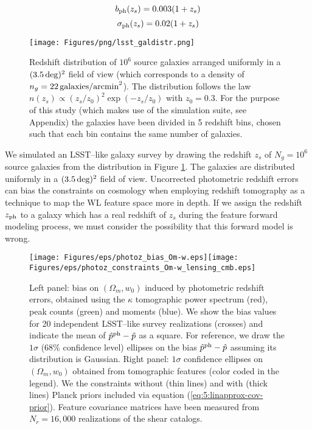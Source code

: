 \begin{equation}
\label{eq:7:bph}
b_{\rm ph}(z_s) = 0.003(1+z_s)
\end{equation}
%
\begin{equation}
\label{eq:7:sph}
\sigma_{\rm ph}(z_s) = 0.02(1+z_s)
\end{equation}
%
\begin{figure}
\begin{center}
\texttt{[image: Figures/png/lsst\_galdistr.png]}
\end{center}
\caption{Redshift distribution of $10^6$ source galaxies arranged uniformly in a $(3.5\,{\rm deg})^2$ field of view (which corresponds to a density of $n_g=22\,{\rm galaxies/arcmin}^2$). The distribution follows the law $n(z_s)\propto (z_s/z_0)^2\exp(-z_s/z_0)$ with $z_0=0.3$. For the purpose of this study (which makes use of the  simulation suite, see Appendix) the galaxies have been divided in 5 redshift bins, chosen such that each bin contains the same number of galaxies.}
\label{fig:7:galdistr}
\end{figure}
%
We simulated an LSST--like galaxy survey by drawing the redshift $z_s$ of $N_g=10^6$ source galaxies from the distribution in Figure \ref{fig:7:galdistr}. The galaxies are distributed uniformly in a $(3.5\,{\rm deg})^2$ field of view. Uncorrected photometric redshift errors can bias the constraints on cosmology when employing redshift tomography as a technique to map the WL feature space \citep{HutererWLSys,PetriPhotoZ} more in depth. If we assign the redshift $z_{\rm ph}$ to a galaxy which has a real redshift of $z_s$ during the feature forward modeling process, we must consider the possibility that this forward model is wrong. 
%
\begin{figure}
\begin{center}
\texttt{[image: Figures/eps/photoz\_bias\_Om-w.eps]}\texttt{[image: Figures/eps/photoz\_constraints\_Om-w\_lensing\_cmb.eps]}
\end{center}
\caption{Left panel: bias on $(\Omega_m,w_0)$ induced by photometric redshift errors, obtained using the $\kappa$ tomographic power spectrum (red), peak counts (green) and moments (blue). We show the bias values for 20 independent LSST--like survey realizations (crosses) and indicate the mean of $\hat{p}^{\rm ph}-\hat{p}$ as a square. For reference, we draw the $1\sigma$ (68\% confidence level) ellipses on the bias $\hat{p}^{\rm ph}-\hat{p}$ assuming its distribution is Gaussian. Right panel: $1\sigma$ confidence ellipses on $(\Omega_m,w_0)$ obtained from tomographic features (color coded in the legend). We the constraints without (thin lines) and with (thick lines) Planck \citep{Planck15} priors included via equation (\ref{eq:5:linapprox-cov-prior}). Feature covariance matrices have been measured from $N_r=16,000$ realizations of the shear catalogs.}
\label{fig:7:photoz}
\end{figure}
